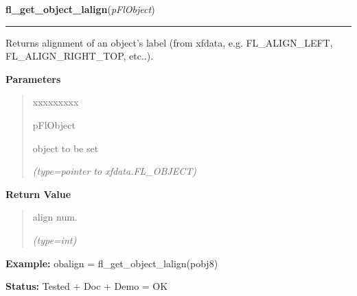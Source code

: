 \hspace{.8\funcindent}\begin{boxedminipage}{\funcwidth}

    \raggedright \textbf{fl\_get\_object\_lalign}(\textit{pFlObject})

    \vspace{-1.5ex}

    \rule{\textwidth}{0.5\fboxrule}
\setlength{\parskip}{2ex}
    Returns alignment of an object's label (from xfdata, e.g. 
    FL\_ALIGN\_LEFT, FL\_ALIGN\_RIGHT\_TOP, etc..).

\setlength{\parskip}{1ex}
      \textbf{Parameters}
      \vspace{-1ex}

      \begin{quote}
        \begin{Ventry}{xxxxxxxxx}

          \item[pFlObject]

          object to be set

            {\it (type=pointer to xfdata.FL\_OBJECT)}

        \end{Ventry}

      \end{quote}

      \textbf{Return Value}
    \vspace{-1ex}

      \begin{quote}
      align num.

      {\it (type=int)}

      \end{quote}

\textbf{Example:} obalign = fl\_get\_object\_lalign(pobj8)



\textbf{Status:} Tested + Doc + Demo = OK



    \end{boxedminipage}

    \label{xformslib:flbasic:fl_set_object_lalign}

    \vspace{0.5ex}

